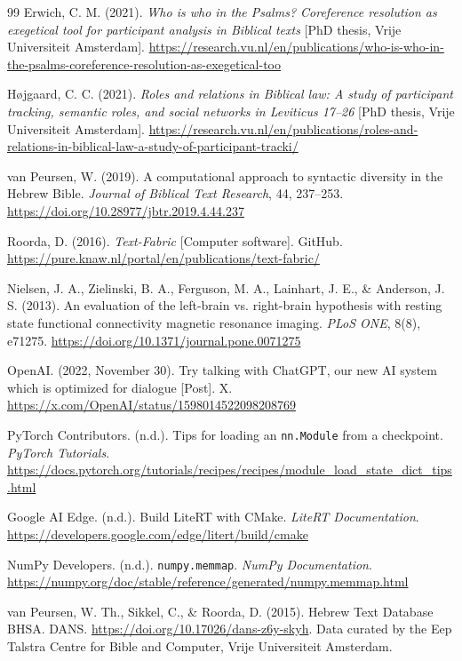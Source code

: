 \documentclass[11pt,a4paper]{article}
\begin{document}
\begin{thebibliography}{99}
Erwich, C. M. (2021). \textit{Who is who in the Psalms? Coreference resolution as exegetical tool for participant analysis in Biblical texts} [PhD thesis, Vrije Universiteit Amsterdam]. \url{https://research.vu.nl/en/publications/who-is-who-in-the-psalms-coreference-resolution-as-exegetical-too}

Højgaard, C. C. (2021). \textit{Roles and relations in Biblical law: A study of participant tracking, semantic roles, and social networks in Leviticus 17--26} [PhD thesis, Vrije Universiteit Amsterdam]. \url{https://research.vu.nl/en/publications/roles-and-relations-in-biblical-law-a-study-of-participant-tracki/}

van Peursen, W. (2019). A computational approach to syntactic diversity in the Hebrew Bible. \textit{Journal of Biblical Text Research}, 44, 237--253. \url{https://doi.org/10.28977/jbtr.2019.4.44.237}

Roorda, D. (2016). \textit{Text-Fabric} [Computer software]. GitHub. \url{https://pure.knaw.nl/portal/en/publications/text-fabric/}

Nielsen, J. A., Zielinski, B. A., Ferguson, M. A., Lainhart, J. E., \& Anderson, J. S. (2013). An evaluation of the left-brain vs. right-brain hypothesis with resting state functional connectivity magnetic resonance imaging. \textit{PLoS ONE}, 8(8), e71275. \url{https://doi.org/10.1371/journal.pone.0071275}

OpenAI. (2022, November 30). Try talking with ChatGPT, our new AI system which is optimized for dialogue [Post]. X. \url{https://x.com/OpenAI/status/1598014522098208769}

PyTorch Contributors. (n.d.). Tips for loading an \texttt{nn.Module} from a checkpoint. \textit{PyTorch Tutorials}. \url{https://docs.pytorch.org/tutorials/recipes/recipes/module_load_state_dict_tips.html}

Google AI Edge. (n.d.). Build LiteRT with CMake. \textit{LiteRT Documentation}. \url{https://developers.google.com/edge/litert/build/cmake}

NumPy Developers. (n.d.). \texttt{numpy.memmap}. \textit{NumPy Documentation}. \url{https://numpy.org/doc/stable/reference/generated/numpy.memmap.html}

van Peursen, W. Th., Sikkel, C., \& Roorda, D. (2015). Hebrew Text Database BHSA. DANS. \url{https://doi.org/10.17026/dans-z6y-skyh}. Data curated by the Eep Talstra Centre for Bible and Computer, Vrije Universiteit Amsterdam.


\end{thebibliography}
\end{document}
